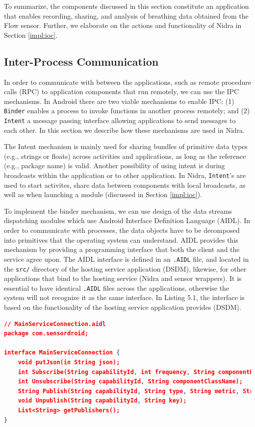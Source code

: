 To summarize, the components discussed in this section constitute an application that enables recording, sharing, and analysis of breathing data obtained from the Flow sensor. Further, we elaborate on the actions and functionality of Nidra in Section \ref{impl:ioc}.  


\subsection{Inter-Process Communication}\label{implement:aidl}
In order to communicate with between the applications, such as remote procedure calls (RPC) to application components that run remotely, we can use the IPC mechanisms. In Android there are two viable mechanisms to enable IPC: (1) \verb|Binder| enables a process to invoke functions in another process remotely; and (2) \verb|Intent| a message passing interface allowing applications to send messages to each other. In this section we describe how these mechanisms are used in Nidra.

The Intent mechanism is mainly used for sharing bundles of primitive data types (e.g., strings or floats) across activities and applications, as long as the reference (e.g., package name) is valid. Another possibility of using intent is during broadcasts within the application or to other application. In Nidra, \verb|Intent|'s are used to start activites, share data between components with local broadcasts, as well as when launching a module (discussed in Section \ref{impl:ioc}).

To implement the binder mechanism, we can use design of the data streams dispatching modules which use Android Interface Definition Language (AIDL). In order to communicate with processes, the data objects have to be decomposed into primitives that the operating system can understand. AIDL provides this mechanism by providing a programming interface that both the client and the service agree upon. The AIDL interface is defined in an \verb|.AIDL| file, and located in the \verb|src/| directory of the hosting service application (DSDM), likewise, for other applications that bind to the hosting service (Nidra and sensor wrappers). It is essential to have identical \verb|.AIDL| files across the applications, otherwise the system will not recognize it as the same interface. In Listing 5.1, the interface is based on the functionality of the hosting service application provides (DSDM). 

\begin{lstlisting}[language=json, caption={An interface provided by the host service (i.e., DSDM) that provides functionality other applications can use (e.g., Nidra and sensor wrappers)}, captionpos=b]
// MainServiceConnection.aidl
package com.sensordroid;

interface MainServiceConnection {
    void putJson(in String json);
    int Subscribe(String capabilityId, int frequency, String componentPackageName, String componentClassName);
    int Unsubscribe(String capabilityId, String componentClassName);
    String Publish(String capabilityId, String type, String metric, String description);
    void Unpublish(String capabilityId, String key);
    List<String> getPublishers();
}
\end{lstlisting}

